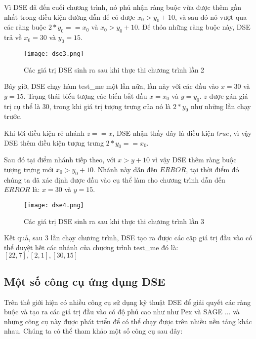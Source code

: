 Vì DSE đã đến cuối chương trình, nó phủ nhận ràng buộc vừa được thêm gần nhất trong điều kiện đường dẫn để có được $ x_{0} > y_{0} + 10 $, và sau đó nó vượt qua các ràng buộc $ 2*y_{0} == x_{0} $ và $ x_{0} > y_{0} + 10$. Để thỏa những ràng buộc này, DSE trả về $x_{0} = 30$ và $y_{0} = 15$.

\begin{center}
	\begin{figure}[H]
		\begin{center}
			\texttt{[image: dse3.png]}
		\end{center}
		\caption{Các giá trị DSE sinh ra sau khi thực thi chương trình lần 2}
		\label{dse3}
	\end{figure}
\end{center}

Bây giờ, DSE chạy hàm test\_me một lần nữa, lần này với các đầu vào $x = 30$ và $y = 15$. Trạng thái biểu tượng các biến bắt đầu $x = x_{0}$ và $y = y_{0}$. $z$ được gán giá trị cụ thể là $30$, trong khi giá trị tượng trưng của nó là $2*y_0$ như những lần chạy trước.

Khi tới điều kiện rẻ nhánh $z == x$, DSE nhận thấy đây là điều kiện $true$, vì vậy DSE thêm điều kiện tượng trưng $2*y_{0} == x_{0}$.

Sau đó tại điểm nhánh tiếp theo, với $x > y + 10$ vì vậy DSE thêm ràng buộc tượng trưng mới $ x_{0} > y_{0}+ 10 $. Nhánh này dẫn đến $ERROR$, tại thời điểm đó chúng ta đã xác định được đầu vào cụ thể làm cho chương trình dẫn đến $ERROR$ là: $x = 30$ và $y = 15$.

\begin{center}
	\begin{figure}[H]
		\begin{center}
			\texttt{[image: dse4.png]}
		\end{center}
		\caption{Các giá trị DSE sinh ra sau khi thực thi chương trình lần 3}
		\label{dse4}
	\end{figure}
\end{center}

Kết quả, sau 3 lần chạy chương trình, DSE tạo ra được các cặp giá trị đầu vào có thể duyệt hết các nhánh của chương trình test\_me đó là: $[22,7], [2,1], [30,15]$
	
\subsection{Một số công cụ ứng dụng DSE}	
Trên thế giới hiện có nhiều công cụ sử dụng kỹ thuật DSE để giải quyết các ràng buộc và tạo ra các giá trị đầu vào có độ phủ cao như như Pex \cite{tillmann2008pex} và SAGE \cite{godefroid2008automated}... và những công cụ này được phát triển để có thể chạy được trên nhiều nền tảng khác nhau. Chúng ta có thể tham khảo một số công cụ sau đây:
		
